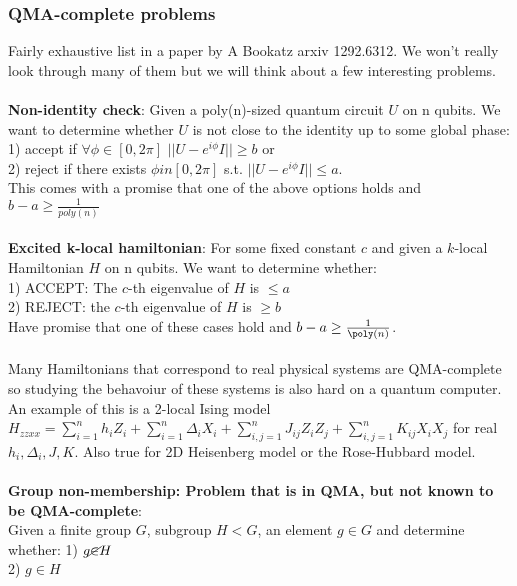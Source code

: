 \documentclass{article}
\begin{document}
\subsubsection{QMA-complete problems}
Fairly exhaustive list in a paper by A Bookatz arxiv 1292.6312. We won't really look through many of them but we will think about a few interesting problems.\\\\
\textbf{Non-identity check}: Given a poly(n)-sized quantum circuit $U$ on n qubits. We want to determine whether $U$ is not close to the identity up to some global phase:\\
1) accept if $\forall \phi \in [0,2\pi]$ $||U - e^{i \phi} I|| \geq b$ or\\
2) reject if there exists $\phi in [0, 2\pi]$ s.t. $|| U - e^{i \phi} I|| \leq a$.\\
This comes with a promise that one of the above options holds and $b- a \geq \frac{1}{poly(n)}$\\\\
\textbf{Excited k-local hamiltonian}: For some fixed constant $c$ and given a $k$-local Hamiltonian $H$ on n qubits. We want to determine whether:\\
1) ACCEPT: The $c$-th eigenvalue of $H$ is $\leq a$\\
2) REJECT: the $c$-th eigenvalue of $H$ is $\geq b$\\
Have promise that one of these cases hold and $b-a \geq \frac{1}{\poly(n)}$.\\\\
Many Hamiltonians that correspond to real physical systems are QMA-complete so studying the behavoiur of these systems is also hard on a quantum computer. An example of this is a 2-local Ising model $H_{zzxx} = \sum_{i=1}^n h_i Z_i + \sum_{i=1}^n \Delta_i X_i + \sum_{i,j=1}^n J_{ij} Z_i Z_j  + \sum_{i,j =1}^n K_{ij} X_i X_j$ for real $h_i, \Delta_i, J, K$. Also true for 2D Heisenberg model or the Rose-Hubbard model.\\\\
\textbf{Group non-membership: Problem that is in QMA, but not known to be QMA-complete}:\\
Given a finite group $G$, subgroup $H < G$, an element $g \in G$ and determine whether:
1) $g \cancel \in H$\\
2) $g \in H$\\
\end{document}
